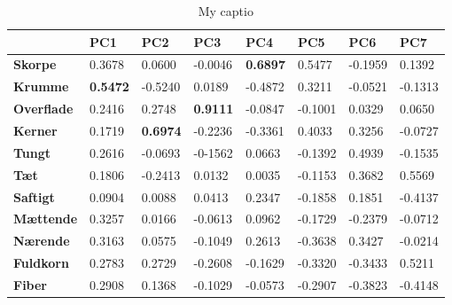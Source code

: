 \begin{table}[H]
\centering
\begin{tabular}{llllllll}
\hline
\textbf{}                               & \textbf{PC1}    & \textbf{PC2}    & \textbf{PC3}    & \textbf{PC4}    & \textbf{PC5} & \textbf{PC6} & \textbf{PC7} \\ \hline
\multicolumn{1}{l|}{\textbf{Skorpe}}    & 0.3678          & 0.0600          & -0.0046         & \textbf{0.6897} & 0.5477       & -0.1959      & 0.1392       \\
\multicolumn{1}{l|}{\textbf{Krumme}}    & \textbf{0.5472} & -0.5240         & 0.0189          & -0.4872         & 0.3211       & -0.0521      & -0.1313      \\
\multicolumn{1}{l|}{\textbf{Overflade}} & 0.2416          & 0.2748          & \textbf{0.9111} & -0.0847         & -0.1001      & 0.0329       & 0.0650       \\
\multicolumn{1}{l|}{\textbf{Kerner}}    & 0.1719          & \textbf{0.6974} & -0.2236         & -0.3361         & 0.4033       & 0.3256       & -0.0727      \\
\multicolumn{1}{l|}{\textbf{Tungt}}     & 0.2616          & -0.0693         & -0-1562         & 0.0663          & -0.1392      & 0.4939       & -0.1535      \\
\multicolumn{1}{l|}{\textbf{Tæt}}       & 0.1806          & -0.2413         & 0.0132          & 0.0035          & -0.1153      & 0.3682       & 0.5569       \\
\multicolumn{1}{l|}{\textbf{Saftigt}}   & 0.0904          & 0.0088          & 0.0413          & 0.2347          & -0.1858      & 0.1851       & -0.4137      \\
\multicolumn{1}{l|}{\textbf{Mættende}}  & 0.3257          & 0.0166          & -0.0613         & 0.0962          & -0.1729      & -0.2379      & -0.0712      \\
\multicolumn{1}{l|}{\textbf{Nærende}}   & 0.3163          & 0.0575          & -0.1049         & 0.2613          & -0.3638      & 0.3427       & -0.0214      \\
\multicolumn{1}{l|}{\textbf{Fuldkorn}}  & 0.2783          & 0.2729          & -0.2608         & -0.1629         & -0.3320      & -0.3433      & 0.5211       \\
\multicolumn{1}{l|}{\textbf{Fiber}}     & 0.2908          & 0.1368          & -0.1029         & -0.0573         & -0.2907      & -0.3823      & -0.4148     
\end{tabular}
\caption{My captio}
\label{tab:loadings}
\end{table}

